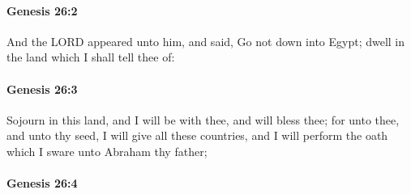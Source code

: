 
		\paragraph{Genesis 26:2} %
			\label{GENESIS-26-2}

			And the LORD appeared unto him, and said, Go not down into Egypt; dwell in the land which I shall tell thee of:


		\paragraph{Genesis 26:3} %
			\label{GENESIS-26-3}

			Sojourn in this land, and I will be with thee, and will bless thee; for unto thee, and unto thy seed, I will give all these countries, and I will perform the oath which I sware unto Abraham thy father;


		\paragraph{Genesis 26:4} %
			\label{GENESIS-26-4}

